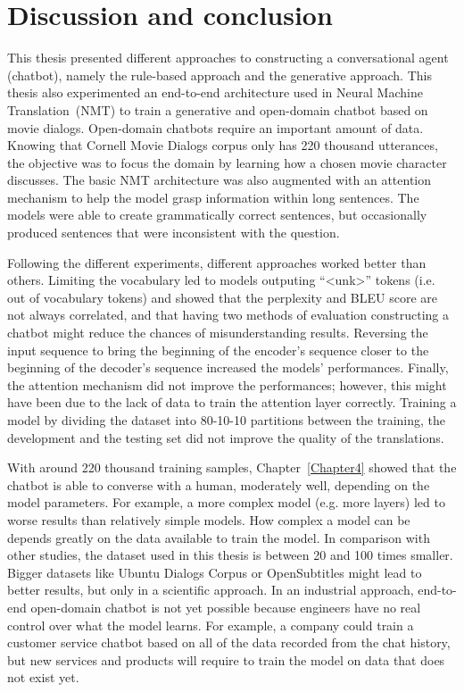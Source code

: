 
\chapter{Discussion and conclusion} %

\label{Chapter5} %

This thesis presented different approaches to constructing a conversational agent (chatbot), namely the rule-based approach and the generative approach. This thesis also experimented an end-to-end architecture used in Neural Machine Translation~(NMT) to train a generative and open-domain chatbot based on movie dialogs.
Open-domain chatbots require an important amount of data. Knowing that Cornell Movie Dialogs corpus only has 220 thousand utterances, the objective was to focus the domain by learning how a chosen movie character discusses.
The basic NMT architecture was also augmented with an attention mechanism to help the model grasp information within long sentences.
The models were able to create grammatically correct sentences, but occasionally produced sentences that were inconsistent with the question.

Following the different experiments, different approaches worked better than others.
Limiting the vocabulary led to models outputing ``<unk>'' tokens (i.e. out of vocabulary tokens) and showed that the perplexity and BLEU score are not always correlated, and that having two methods of evaluation constructing a chatbot might reduce the chances of misunderstanding results.
Reversing the input sequence to bring the beginning of the encoder's sequence closer to the beginning of the decoder's sequence increased the models' performances.
Finally, the attention mechanism did not improve the performances; however, this might have been due to the lack of data to train the attention layer correctly.
Training a model by dividing the dataset into 80-10-10 partitions between the training, the development and the testing set did not improve the quality of the translations.

With around 220 thousand training samples, Chapter~\ref{Chapter4} showed that the chatbot is able to converse with a human, moderately well, depending on the model parameters. For example, a more complex model (e.g. more layers) led to worse results than relatively simple models.
How complex a model can be depends greatly on the data available to train the model. In comparison with other studies, the dataset used in this thesis is between \num{20} \citep{DBLP:journals/corr/LowePSP15} and \num{100} \citep{1506.05869} times smaller.
Bigger datasets like Ubuntu Dialogs Corpus \citep{DBLP:journals/corr/LowePSP15} or OpenSubtitles \citep{open-subtitle} might lead to better results, but only in a scientific approach.
In an industrial approach, end-to-end open-domain chatbot is not yet possible because engineers have no real control over what the model learns.
For example, a company could train a customer service chatbot based on all of the data recorded from the chat history, but new services and products will require to train the model on data that does not exist yet.

